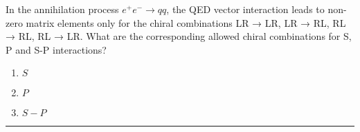 \begin{problem}{11.4}
In the annihilation process $e^+e^- \to qq$, the QED vector interaction leads to non-zero matrix elements only for the chiral combinations LR → LR, LR → RL, RL → RL, RL → LR. What are the corresponding allowed chiral combinations for S, P and S-P interactions?
\end{problem}
\begin{solution}
\begin{enumerate}[label=(\roman*)]
    \item $S$
    \item $P$
    \item $S-P$
\end{enumerate}
\end{solution}

\noindent\rule{7in}{1.5pt}


